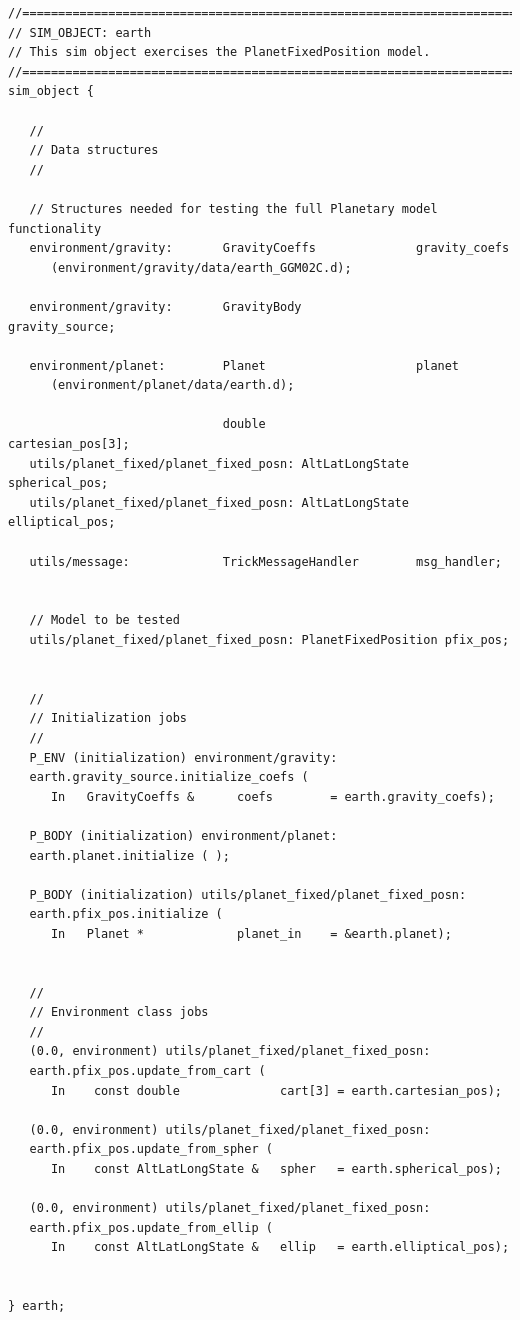 \documentclass[twoside,11pt,titlepage]{report}
\begin{document}
\begin{verbatim}
//==============================================================================
// SIM_OBJECT: earth
// This sim object exercises the PlanetFixedPosition model.
//==============================================================================
sim_object {

   //
   // Data structures
   //

   // Structures needed for testing the full Planetary model functionality
   environment/gravity:       GravityCoeffs              gravity_coefs
      (environment/gravity/data/earth_GGM02C.d);

   environment/gravity:       GravityBody                gravity_source;

   environment/planet:        Planet                     planet
      (environment/planet/data/earth.d);

                              double                     cartesian_pos[3];
   utils/planet_fixed/planet_fixed_posn: AltLatLongState spherical_pos;
   utils/planet_fixed/planet_fixed_posn: AltLatLongState elliptical_pos;

   utils/message:             TrickMessageHandler        msg_handler;


   // Model to be tested
   utils/planet_fixed/planet_fixed_posn: PlanetFixedPosition pfix_pos;


   //
   // Initialization jobs
   //
   P_ENV (initialization) environment/gravity:
   earth.gravity_source.initialize_coefs (
      In   GravityCoeffs &      coefs        = earth.gravity_coefs);

   P_BODY (initialization) environment/planet:
   earth.planet.initialize ( );

   P_BODY (initialization) utils/planet_fixed/planet_fixed_posn:
   earth.pfix_pos.initialize (
      In   Planet *             planet_in    = &earth.planet);


   //
   // Environment class jobs
   //
   (0.0, environment) utils/planet_fixed/planet_fixed_posn:
   earth.pfix_pos.update_from_cart (
      In    const double              cart[3] = earth.cartesian_pos);

   (0.0, environment) utils/planet_fixed/planet_fixed_posn:
   earth.pfix_pos.update_from_spher (
      In    const AltLatLongState &   spher   = earth.spherical_pos);

   (0.0, environment) utils/planet_fixed/planet_fixed_posn:
   earth.pfix_pos.update_from_ellip (
      In    const AltLatLongState &   ellip   = earth.elliptical_pos);


} earth;
\end{verbatim}
\end{document}
